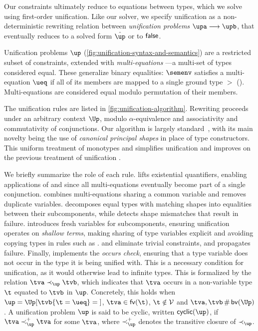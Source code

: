 \documentclass[acmsmall,screen,nonacm%
\Anonymous{,anonymous}{}%
\Final{}{,review}%
]{acmart}
\newcommand{\BBemlti}{Pottier-Remy/emlti}
\newcommand{\BBpolyml}{Garrigue-Remy/poly-ml}
\begin{document}
Our constraints ultimately reduce to equations between types, which we solve
using first-order unification. Like our solver, we specify unification as a
non-deterministic rewriting relation between \emph{unification problems} $\upa
\unif \upb$, that eventually reduces to a solved form $\hat\up$ or to $\mathsf{false}$.


Unification problems $\up$
(\cref{fig:unification-syntax-and-semantics}) are a restricted subset
of constraints, extended with \emph{multi-equations}
\citep*{\BBemlti}---a multi-set of types considered
equal. These generalize binary equalities: $\semenv$ satisfies
a multi-equation $\ueq$ if all of its members are mapped to a single
ground type $\gt$ (). Multi-equations are
considered equal modulo permutation of their members.

The unification rules are listed in \cref{fig:unification-algorithm}. Rewriting
proceeds under an arbitrary context $\Up$, modulo $\alpha$-equivalence and
associativity and commutativity of conjunctions.
%
Our algorithm is largely standard~\citep*{\BBemlti}, with its main
novelty being the use of \emph{canonical principal shapes} in place of type
constructors. This uniform treatment of monotypes and \polytypes simplifies
unification and improves on the previous treatment of \polytype unification
\citep{\BBpolyml}.


We briefly summarize the role of each rule.  lifts existential
quantifiers, enabling applications of  and  since
all multi-equations eventually become part of a single conjunction.
 combines multi-equations sharing a common variable and
 removes duplicate variables.  decomposes equal
types with matching shapes into equalities between their subcomponents, while
 detects shape mismatches that result in failure. 
introduces fresh variables for subcomponents, ensuring unification operates on
\emph{shallow terms}, making sharing of type variables explicit and avoiding
copying types in rules such as .  and
 eliminate trivial constraints, and  propagates
failure.
%
Finally,  implements the \emph{occurs check}, ensuring that a
type variable does not occur in the type it is being unified with. This is a
necessary condition for unification, as it would otherwise lead to infinite
types.
This is formalized by the relation $\tv \prec_\up \tvb$, which indicates that
$\tv$ occurs in a non-variable type $\t$ equated to $\tvb$ in $\up$. Concretely, this holds when 
$\up = \Up\where{\cunif \tvb {\cunif \t \ueq}}$,
$\tv \in \fvs \t$, $\t \notin \TyVars$ and $\tv, \tvb \disjoint \bvs \Up$.
%
A unification problem $\up$ is said to be cyclic, written $\cyclic \up$, if
$\tv \prec_\up^+ \tv$ for some $\tv$, where $\prec_\up^+$ denotes the 
transitive closure of $\prec_\up$. 
\end{document}
